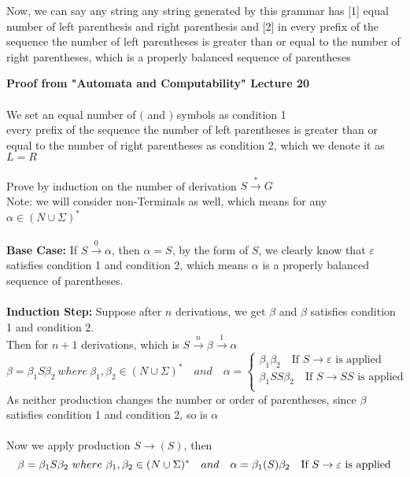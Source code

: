 \documentclass [9 pt]{article}
\theoremstyle{definition}
\begin{document}
Now, we can say any string any string generated by this grammar has [1] equal number of left parenthesis and right parenthesis and [2] in every prefix of the sequence the number of left parentheses is greater than or equal to the number of right parentheses, which is a properly balanced sequence of parentheses







\newpage
\textbf{Proof from "Automata and Computability" Lecture 20}\\\\
We set  an equal number of $($ and $)$ symbols as condition 1\\
every prefix of the sequence the number of left parentheses is greater than or equal to the number of right parentheses as condition 2, which we denote it as $L = R$\\
\\
Prove by induction on the number of derivation $S \xrightarrow{*} G$\\
Note: we will consider non-Terminals as well, which means for any $\alpha \in (N \cup \Sigma)^*$\\
\\
\textbf{Base Case:}
If $S \xrightarrow{0} \alpha$, then $\alpha = S$, by the form of $S$, we clearly know that $\varepsilon$ satisfies condition 1 and condition 2, which means $\alpha$ is a properly balanced sequence of parentheses.\\
\\
\textbf{Induction Step:}
Suppose after $n$ derivations, we get $\beta$ and $\beta$ satisfies condition 1 and condition 2.\\
Then for $n+1$ derivations, which is $S \xrightarrow{n} \beta \xrightarrow{1} \alpha$
$$ \beta = \beta_1 S \beta_2\ where\ \beta_1, \beta_2 \in (N \cup \Sigma)^* \quad and \quad \alpha =  \begin{cases}
	\beta_1 \beta_2 \quad \text{If } S \to \varepsilon \text{ is applied}\\
	\beta_1 SS \beta_2 \quad \text{If } S \to SS \text{ is applied}\\
\end{cases} $$
As neither production changes the number or order of parentheses, since $\beta$ satisfies condition 1 and condition 2, so is $\alpha$\\
\\
Now we apply production $S \to (S)$, then 
$$ \beta = \beta_1 S \beta_2\ where\ \beta_1, \beta_2 \in (N \cup \Sigma)^* \quad and \quad \alpha =  	\beta_1 (S)\beta_2 \quad \text{If } S \to \varepsilon \text{ is applied}\\ $$
\end{document}
